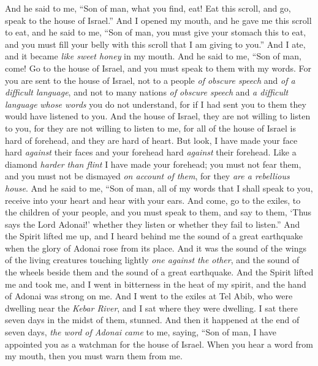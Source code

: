 \begin{biblechapter} %
\verse And he said to me, “Son of man, what you find, eat! Eat this scroll, and go, speak to the house of Israel.”
\verse And I opened my mouth, and he gave me this scroll to eat,
\verse and he said to me, “Son of man, you must give your stomach this to eat, and you must fill your belly with this scroll that I am giving to you.” And I ate, and it became \textit{like sweet honey} in my mouth.
\verse And he said to me, “Son of man, come! Go to the house of Israel, and you must speak to them with my words.
\verse For you are sent to the house of Israel, not to a people \textit{of obscure speech} and \textit{of a difficult language},
\verse and not to many nations \textit{of obscure speech} and \textit{a difficult language} \textit{whose words} you do not understand, for if I had sent you to them they would have listened to you.
\verse And the house of Israel, they are not willing to listen to you, for they are not willing to listen to me, for all of the house of Israel is hard of forehead, and they are hard of heart.
\verse But look, I have made your face hard \textit{against} their faces and your forehead hard \textit{against} their forehead.
\verse Like a diamond \textit{harder than flint} I have made your forehead; you must not fear them, and you must not be dismayed \textit{on account of them}, for they \textit{are a rebellious house}.
\verse And he said to me, “Son of man, all of my words that I shall speak to you, receive into your heart and hear with your ears.
\verse And come, go to the exiles, to the children of your people, and you must speak to them, and say to them, ‘Thus says the Lord Adonai!’ whether they listen or whether they fail to listen.”
\verse And the Spirit lifted me up, and I heard behind me the sound of a great earthquake when the glory of Adonai rose from its place.
\verse And it was the sound of the wings of the living creatures touching lightly \textit{one against the other}, and the sound of the wheels beside them and the sound of a great earthquake.
\verse And the Spirit lifted me and took me, and I went in bitterness in the heat of my spirit, and the hand of Adonai was strong on me.
\verse And I went to the exiles at Tel Abib, who were dwelling near the \textit{Kebar River}, and I sat where they were dwelling. I sat there seven days in the midst of them, stunned.
\verse And then it happened at the end of seven days, \textit{the word of Adonai came} to me, saying,
\verse “Son of man, I have appointed you as a watchman for the house of Israel. When you hear a word from my mouth, then you must warn them from me.

\end{biblechapter}
